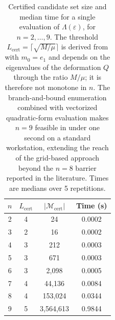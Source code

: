 \begin{table}[htbp]\centering
\caption{Certified candidate set size and median time for a single evaluation
of \(\Lambda(\varepsilon)\), for \(n=2,\dots,9\). The threshold
\(L_{\mathrm{cert}}=\lceil\sqrt{M/\mu}\rceil\) is derived from
 with \(m_0=e_1\) and depends on the eigenvalues of the
deformation \(Q\) through the ratio \(M/\mu\); it is therefore not monotone
in \(n\). The branch-and-bound enumeration combined with vectorized
quadratic-form evaluation makes \(n=9\) feasible in under one second on a
standard workstation, extending the reach of the grid-based approach beyond
the \(n=8\) barrier reported in the literature. Times are medians over
5 repetitions.}
\label{tab:complexity}
\begin{tabular}{cccc}\hline
\(n\) & \(L_{\mathrm{cert}}\) & \(|\mathcal{M}_{\mathrm{cert}}|\) & Time (s) \\\hline
2 & 4 & 24 & 0.0002 \\
3 & 2 & 16 & 0.0002 \\
4 & 3 & 212 & 0.0003 \\
5 & 3 & 671 & 0.0003 \\
6 & 3 & 2{,}098 & 0.0005 \\
7 & 4 & 44{,}136 & 0.0084 \\
8 & 4 & 153{,}024 & 0.0344 \\
9 & 5 & 3{,}564{,}613 & 0.9844 \\
\hline\end{tabular}\end{table}